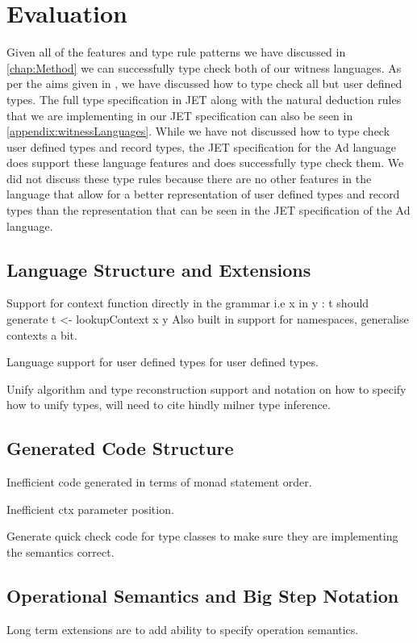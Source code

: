 \chapter{Evaluation}
Given all of the features and type rule patterns we have discussed in \autoref{chap:Method} we can successfully type check both of our witness languages.
As per the aims given in , we have discussed how to type check all but user defined types.
The full type specification in JET along with the natural deduction rules that we are implementing in our JET specification can also be seen in \autoref{appendix:witnessLanguages}.
While we have not discussed how to type check user defined types and record types, the JET specification for the Ad language does support these language features and does successfully type check them.
We did not discuss these type rules because there are no other features in the language that allow for a better representation of user defined types and record types than the representation that can be seen in the JET specification of the Ad language.

\section{Language Structure and Extensions}
Support for context function directly in the grammar i.e x in y : t should generate t <- lookupContext x y
Also built in support for namespaces, generalise contexts a bit.

Language support for user defined types for user defined types.

Unify algorithm and type reconstruction support and notation on how to specify how to unify types, will need to cite hindly milner type inference.

\section{Generated Code Structure}
Inefficient code generated in terms of monad statement order.

Inefficient ctx parameter position.

Generate quick check code for type classes to make sure they are implementing the semantics correct.

\section{Operational Semantics and Big Step Notation}
Long term extensions are to add ability to specify operation semantics.
